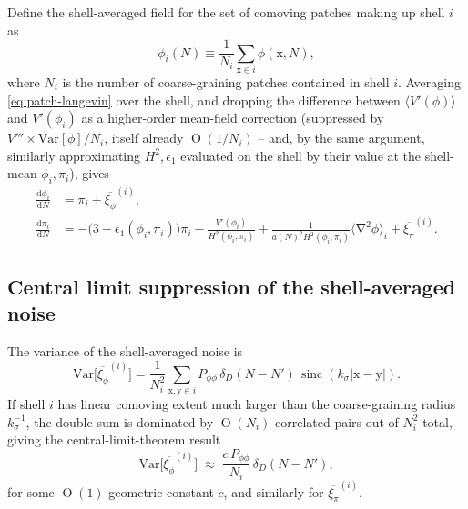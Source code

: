 \documentclass[a4paper,11pt]{article}
\DeclareMathOperator{\Or}{O}
\renewcommand{\d}{\mathrm{d}}
\newcommand{\vect}[1]{\bm{\mathrm{{#1}}}}
\DeclareMathOperator{\grad}{\nabla}
\DeclareMathOperator{\sinc}{sinc}
\newcommand{\Ny}{N}                          %
\newcommand{\epsSR}{\epsilon_1}              %
\newcommand{\Hub}{H}                         %
\newcommand{\sfactor}{a}                     %
\newcommand{\field}{\phi}                    %
\newcommand{\mom}{\pi}                       %
\newcommand{\Vpot}{V}                        %
\newcommand{\noise}[1]{\xi_{#1}}             %
\newcommand{\Nlay}[1]{N_{#1}}                %
\newcommand{\Pspec}[1]{P_{#1}}               %
\begin{document}
Define the shell-averaged field for the set of comoving patches making up
shell $i$ as
\begin{equation}
    \field_i(\Ny) \equiv \frac{1}{\Nlay{i}} \sum_{\vect{x} \in i} \field(\vect{x}, \Ny) ,
\end{equation}
where $\Nlay{i}$ is the number of coarse-graining patches contained in
shell $i$. Averaging \eqref{eq:patch-langevin} over the shell, and
dropping the difference between $\langle \Vpot'(\field)\rangle$ and
$\Vpot'(\field_i)$ as a higher-order mean-field correction (suppressed by
$\Vpot''' \times \mathrm{Var}[\field]/\Nlay{i}$, itself already
$\Or(1/\Nlay{i})$ -- and, by the same argument, similarly approximating
$H^2,\epsSR$ evaluated on the shell by their value at the shell-mean
$\field_i,\mom_i$), gives
\begin{subequations}
\begin{align}
    \frac{\d \field_i}{\d \Ny}
    & =
    \mom_i + \overline{\noise{\field}}^{(i)} ,
    \\
    \frac{\d \mom_i}{\d \Ny}
    & =
    -\big(3-\epsSR(\field_i,\mom_i)\big)\mom_i - \frac{\Vpot'(\field_i)}{\Hub^2(\field_i,\mom_i)}
    + \frac{1}{\sfactor(\Ny)^2\Hub^2(\field_i,\mom_i)}\big\langle \grad^2\field \big\rangle_i
    + \overline{\noise{\mom}}^{(i)} .
\end{align}
\end{subequations}

\subsection{Central limit suppression of the shell-averaged noise}

The variance of the shell-averaged noise is
\begin{equation}
    \mathrm{Var}\big[\overline{\noise{\field}}^{(i)}\big]
    =
    \frac{1}{\Nlay{i}^2} \sum_{\vect{x},\vect{y} \in i}
    \Pspec{\field\field} \, \delta_D(\Ny-\Ny') \, \sinc(k_\sigma|\vect{x}-\vect{y}|) .
\end{equation}
If shell $i$ has linear comoving extent much larger than the
coarse-graining radius $k_\sigma^{-1}$, the double sum is dominated by
$\Or(\Nlay{i})$ correlated pairs out of $\Nlay{i}^2$ total, giving the
central-limit-theorem result
\begin{equation}
    \mathrm{Var}\big[\overline{\noise{\field}}^{(i)}\big]
    \; \approx \;
    \frac{c \, \Pspec{\field\field}}{\Nlay{i}} \, \delta_D(\Ny-\Ny') ,
    \label{eq:CLT-suppression}
\end{equation}
for some $\Or(1)$ geometric constant $c$, and similarly for
$\overline{\noise{\mom}}^{(i)}$.
\end{document}
